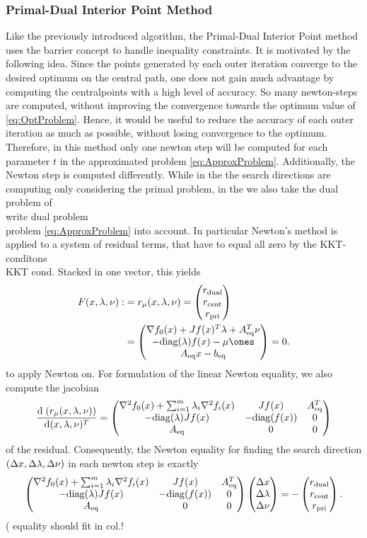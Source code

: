 \subsubsection{Primal-Dual Interior Point Method}
Like the previously introduced algorithm, the Primal-Dual Interior Point method uses the barrier concept to handle inequality constraints. It is motivated by the following idea. Since the points generated by each outer iteration converge to the desired optimum on the central path, one does not gain much advantage by computing the centralpoints with a high level of accuracy. So many newton-steps are computed, without improving the convergence towards the optimum value of \eqref{eq:OptProblem}. Hence, it would be useful to reduce the accuracy of each outer iteration as much as possible, without losing convergence to the optimum. Therefore, in this method only one newton step will be computed for each parameter $ t $ in the approximated problem  \eqref{eq:ApproxProblem}. Additionally, the Newton step is computed differently. While in the the search directions are computing only considering the primal problem, in the \pdm we also take the dual problem of\\
\todo write dual problem\\
problem \eqref{eq:ApproxProblem} into account. In particular Newton's method is applied to a system of residual terms, that have to equal all zero by the KKT-conditons\\
\todo KKT cond.
Stacked in one vector, this yields
\begin{align}
\begin{split}
\label{eq:KKTres}
	 F(x,\lambda,\nu) :&= \rmu = \vectorthree{\rdual}{\rcent}{\rpri}\\ &= \vectorthree{\grad \fnull(x) + \jac \fx \trp \lambda + \Aeq \trp \nu}{-\diag(\lambda)\fx - \mu \ones}{\Aeq x - \beq} = 0.
\end{split}
\end{align}
to apply Newton on. For formulation of the linear Newton equality, we also compute  the jacobian
\begin{align}
	\frac{\mathrm{d} \; ( r_\mu (x,\lambda,\nu))}{\mathrm{d} (x,\lambda,\nu)^T} = 
	\begin{pmatrix}
		\nabla^2 f_0(x) + \sum_{i = 1}^{m} \lambda_i \nabla^2 f_i (x) & J f(x) & {A}_{\mathrm{eq}} ^T\\
		-\mathrm{diag}(\lambda) J f(x) & -\mathrm{diag}(f(x)) & 0\\
		{A}_{\mathrm{eq}} & 0 & 0
	\end{pmatrix}
\end{align}
of the residual. 
Consequently, the Newton equality for finding the search direction $ (\Delta x, \Delta \lambda,\Delta \nu) $ in each newton step is exactly
\begin{align}
\label{eq:rmuNewtonEq}
		\begin{pmatrix}
	\nabla^2 f_0(x) + \sum_{i = 1}^{m} \lambda_i \nabla^2 f_i (x) & J f(x) & {A}_{\mathrm{eq}} ^T\\
	-\mathrm{diag}(\lambda) J f(x) & -\mathrm{diag}(f(x)) & 0\\
	{A}_{\mathrm{eq}} & 0 & 0
	\end{pmatrix} \begin{pmatrix} {\Delta x} \\ {\Delta \lambda} \\ {\Delta \nu} \end{pmatrix} = - \begin{pmatrix} {{r}_{\mathrm{dual}}} \\ {{r}_{\mathrm{cent}}} \\ {{r}_{\mathrm{pri}}} \end{pmatrix}.
\end{align}(
\todo equality should fit in col.!\\

